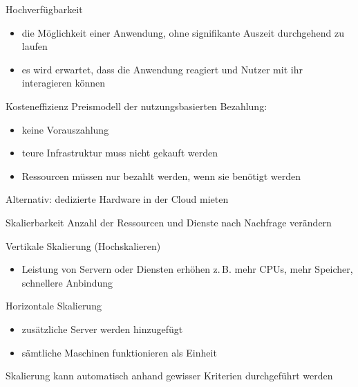 
\begin{flashcard}[Definition]{Hochverfügbarkeit}
    \begin{itemize}
        \item die Möglichkeit einer Anwendung, ohne signifikante Auszeit durchgehend zu laufen
        \item es wird erwartet, dass die Anwendung reagiert und Nutzer mit ihr interagieren können
    \end{itemize}
\end{flashcard}

\begin{flashcard}[Definition]{Kosteneffizienz}
    Preismodell der nutzungsbasierten Bezahlung:
    \begin{itemize}
        \item keine Vorauszahlung
        \item teure Infrastruktur muss nicht gekauft werden
        \item Ressourcen müssen nur bezahlt werden, wenn sie benötigt werden
    \end{itemize}

    \vspace{5mm}
    Alternativ: dedizierte Hardware in der Cloud mieten
\end{flashcard}

\begin{flashcard}[Definition]{Skalierbarkeit}
    Anzahl der Ressourcen und Dienste nach Nachfrage verändern

    \vspace{5mm}
    Vertikale Skalierung (Hochskalieren)
    \begin{itemize}
        \item Leistung von Servern oder Diensten erhöhen\newline
        z.\,B. mehr CPUs, mehr Speicher, schnellere Anbindung
    \end{itemize}

    Horizontale Skalierung
    \begin{itemize}
        \item zusätzliche Server werden hinzugefügt
        \item sämtliche Maschinen funktionieren als Einheit
    \end{itemize}

    \vspace{5mm}
    Skalierung kann automatisch anhand gewisser Kriterien durchgeführt werden
\end{flashcard}

